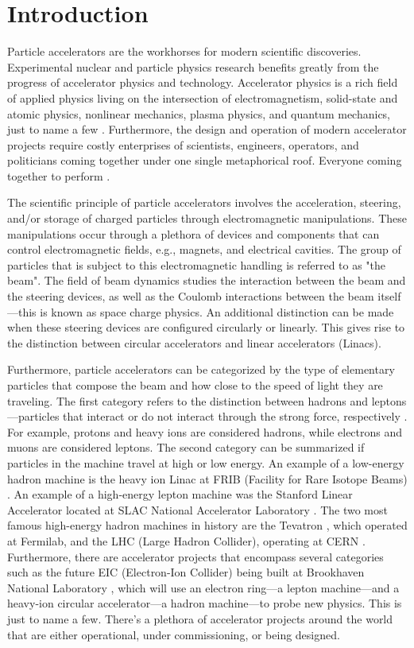 \chapter{Introduction}
\label{sec:ch1}
 
Particle accelerators are the workhorses for modern scientific discoveries. Experimental nuclear and particle physics research benefits greatly from the progress of accelerator physics and technology. Accelerator physics is a rich field of applied physics living on the intersection of electromagnetism, solid-state and atomic physics, nonlinear mechanics, plasma physics, and quantum mechanics, just to name a few \cite{sylee}. Furthermore, the design and operation of modern accelerator projects require costly enterprises of scientists, engineers, operators, and politicians coming together under one single metaphorical roof. Everyone coming together to perform  \cite{fermilab1}.         

The scientific principle of particle accelerators involves the acceleration, steering, and/or storage of charged particles through electromagnetic manipulations. These manipulations occur through a plethora of devices and components that can control electromagnetic fields, e.g., magnets, and electrical cavities. The group of particles that is subject to this electromagnetic handling is referred to as "the beam". The field of beam dynamics studies the interaction between the beam and the steering devices, as well as the Coulomb interactions between the beam itself---this is known as space charge physics. An additional distinction can be made when these steering devices are configured circularly or linearly. This gives rise to the distinction between circular accelerators and linear accelerators (Linacs).

Furthermore, particle accelerators can be categorized by the type of elementary particles that compose the beam and how close to the speed of light they are traveling. The first category refers to the distinction between hadrons and leptons---particles that interact or do not interact through the strong force, respectively \cite{griffiths}. For example, protons and heavy ions are considered hadrons, while electrons and muons are considered leptons. The second category can be summarized if particles in the machine travel at high or low energy. An example of a low-energy hadron machine is the heavy ion Linac at FRIB (Facility for Rare Isotope Beams) \cite{frib}. An example of a high-energy lepton machine was the Stanford Linear Accelerator located at SLAC National Accelerator Laboratory \cite{slac}. The two most famous high-energy hadron machines in history are the Tevatron \cite{tevatron}, which operated at Fermilab, and the LHC (Large Hadron Collider), operating at CERN \cite{lhc}. Furthermore, there are accelerator projects that encompass several categories such as the future EIC (Electron-Ion Collider) being built at Brookhaven National Laboratory \cite{eic}, which will use an electron ring---a lepton machine---and a heavy-ion circular accelerator---a hadron machine---to probe new physics. This is just to name a few. There's a plethora of accelerator projects around the world that are either operational, under commissioning, or being designed. 

